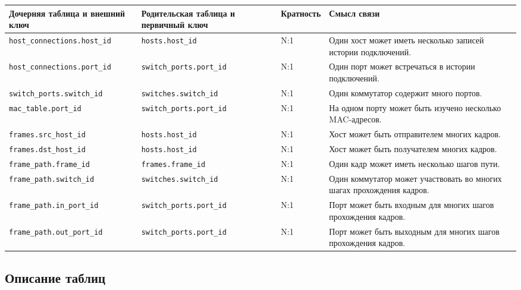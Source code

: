 \documentclass[12pt,a4paper]{article}
\begin{document}
\begin{longtable}{|p{4.7cm}|p{4.7cm}|p{1.6cm}|p{4.1cm}|}
\hline
\textbf{Дочерняя таблица и внешний ключ} & \textbf{Родительская таблица и первичный ключ} & \textbf{Кратность} & \textbf{Смысл связи}\\
\hline
\texttt{host\_connections.host\_id} & \texttt{hosts.host\_id} & N:1 & Один хост может иметь несколько записей истории подключений.\\
\hline
\texttt{host\_connections.port\_id} & \texttt{switch\_ports.port\_id} & N:1 & Один порт может встречаться в истории подключений.\\
\hline
\texttt{switch\_ports.switch\_id} & \texttt{switches.switch\_id} & N:1 & Один коммутатор содержит много портов.\\
\hline
\texttt{mac\_table.port\_id} & \texttt{switch\_ports.port\_id} & N:1 & На одном порту может быть изучено несколько MAC-адресов.\\
\hline
\texttt{frames.src\_host\_id} & \texttt{hosts.host\_id} & N:1 & Хост может быть отправителем многих кадров.\\
\hline
\texttt{frames.dst\_host\_id} & \texttt{hosts.host\_id} & N:1 & Хост может быть получателем многих кадров.\\
\hline
\texttt{frame\_path.frame\_id} & \texttt{frames.frame\_id} & N:1 & Один кадр может иметь несколько шагов пути.\\
\hline
\texttt{frame\_path.switch\_id} & \texttt{switches.switch\_id} & N:1 & Один коммутатор может участвовать во многих шагах прохождения кадров.\\
\hline
\texttt{frame\_path.in\_port\_id} & \texttt{switch\_ports.port\_id} & N:1 & Порт может быть входным для многих шагов прохождения кадров.\\
\hline
\texttt{frame\_path.out\_port\_id} & \texttt{switch\_ports.port\_id} & N:1 & Порт может быть выходным для многих шагов прохождения кадров.\\
\hline
\end{longtable}

\subsection{Описание таблиц}
\end{document}
